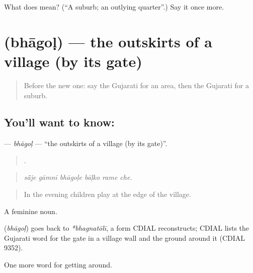 \begin{tcolorbox}[breakable,colback=teal!4,colframe=teal!35!black,title={Before you move on}]
What does  mean? (\textquotedblleft{}A suburb; an outlying quarter\textquotedblright{}.) Say it once more.
\end{tcolorbox}
\section[\texorpdfstring{\gu{ભાગોળ} (bhāgoḷ)}{ભાગોળ (bhāgoḷ)}]{ (bhāgoḷ) — the outskirts of a village (by its gate)}

\label{lesson:GU-C416-bhagol}



\begin{quote}
Before the new one: say the Gujarati for an area, then the Gujarati for a suburb.
\end{quote}

\subsection*{You'll want to know: }
\textbf{} — \emph{bhāgoḷ} — \textquotedblleft{}the outskirts of a village (by its gate)\textquotedblright{}.

\begin{quote}
     .
\end{quote}

\begin{quote}
\emph{sā̃je gāmnī bhāgoḷe bāḷko rame che.}
\end{quote}

\begin{quote}
In the evening children play at the edge of the village.
\end{quote}

A feminine noun.

\begin{cousinweb}
\textbf{} (\emph{bhāgoḷ}) goes back to \emph{*bhagnatōlī}, a form CDIAL reconstructs; CDIAL lists the Gujarati word for the gate in a village wall and the ground around it (CDIAL 9352).
\end{cousinweb}

\begin{grammarlens}[title={What you've built}]
One more word for getting around.
\end{grammarlens}

